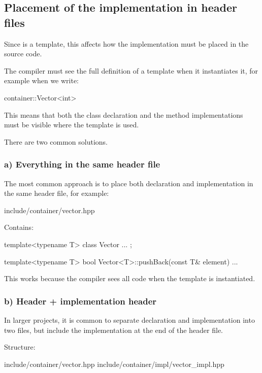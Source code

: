 \subsection{Placement of the implementation in header files}
\label{c5:sec:headers}
Since  is a template, this affects how the implementation must be placed
in the source code.

The compiler must see the full definition of a template when it instantiates it, for example when
we write:

\begin{cppcode}
container::Vector<int>
\end{cppcode}

\noindent This means that both the class declaration and the method implementations must be
visible where the template is used.

There are two common solutions.

\subsubsection{a) Everything in the same header file}
The most common approach is to place both declaration and implementation in the same header file,
for example:

\begin{console}
include/container/vector.hpp
\end{console}

\noindent Contains:

\begin{cppcode}
template<typename T>
class Vector { ... };

template<typename T>
bool Vector<T>::pushBack(const T& element)
{
    ...
}
\end{cppcode}

\noindent This works because the compiler sees all code when the template is instantiated.

\subsubsection{b) Header + implementation header}
In larger projects, it is common to separate declaration and implementation into two files, but
include the implementation at the end of the header file.

Structure:

\begin{console}
include/container/vector.hpp
include/container/impl/vector_impl.hpp
\end{console}

